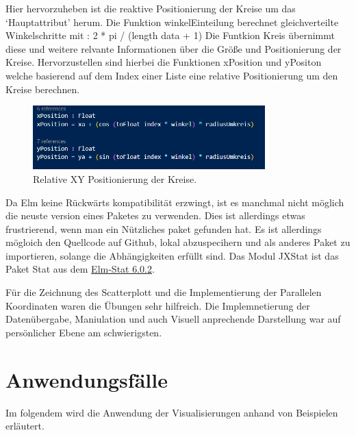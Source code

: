 \documentclass[usegeometry=true]{scrartcl}
\begin{document}
Hier hervorzuheben ist die reaktive Positionierung der Kreise um das `Hauptattribut' herum.
Die Funktion winkelEinteilung berechnet gleichverteilte Winkelschritte mit : 2 * pi / (length data + 1) 
Die Funtkion Kreis übernimmt diese und weitere relvante Informationen über die Größe und Positionierung der Kreise. 
Hervorzustellen sind hierbei die Funktionen xPosition und yPositon welche basierend auf dem Index einer Liste eine relative Positionierung um den Kreise berechnen. 

\begin{figure}[h]
  \centering
  \includegraphics[width = 0.8\textwidth]{RelativeXYPositionierungderKreise.png}
  \caption{Relative XY Positionierung der Kreise.}
\end{figure}


Da Elm keine Rückwärts kompatibilität erzwingt, ist es manchmal nicht möglich die neuste version eines Paketes zu verwenden. 
Dies ist allerdings etwas frustrierend, wenn man ein Nützliches paket gefunden hat. Es ist allerdings mögloich den Quellcode auf 
Github, lokal abzuspecihern und als anderes Paket zu importieren, solange die Abhängigkeiten erfüllt sind. Das Modul JXStat ist das Paket Stat aus dem \href{https://github.com/jxxcarlson/elm-stat/blob/6.0.2/src/Stat.elm}{Elm-Stat 6.0.2}. 

Für die Zeichnung des Scatterplott und die Implementierung der Parallelen Koordinaten waren die Übungen sehr hilfreich. Die Implemnetierung der Datenübergabe, Maniulation und auch Visuell anprechende Darstellung war auf persönlicher Ebene am schwierigsten.



\section{Anwendungsfälle}

Im folgendem wird die Anwendung der Visualisierungen anhand von Beispielen erläutert.
\end{document}
